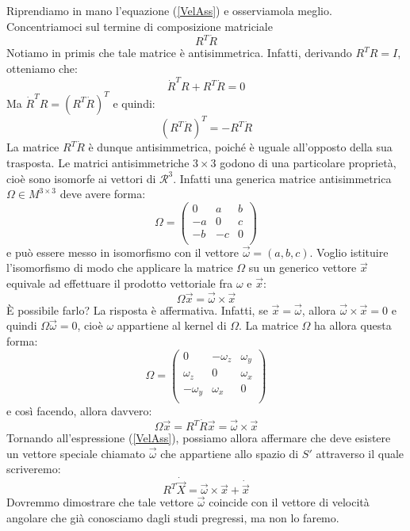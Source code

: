 \documentclass[a4paper,openany]{article}
\begin{document}
	Riprendiamo in mano l'equazione (\ref{VelAss}) e osserviamola meglio. Concentriamoci sul termine di composizione matriciale
	$$
	R^{T}\dot{R}
	$$
	Notiamo in primis che tale matrice è antisimmetrica. Infatti, derivando $R^{T}R = I$, otteniamo che:
	$$
	\dot{R}^{T}R + R^{T}\dot{R} = 0
	$$
	Ma $\dot{R}^{T}R = (R^{T}\dot{R})^{T}$ e quindi:
	$$
	(R^{T}\dot{R})^{T} = - R^{T}\dot{R} 
	$$
	La matrice $R^{T}\dot{R}$ è dunque antisimmetrica, poiché è uguale all'opposto della sua trasposta. Le matrici antisimmetriche $3\times3$ godono di una particolare proprietà, cioè sono isomorfe ai vettori di $\mathcal{R}^{3}$. Infatti una generica matrice antisimmetrica $\Omega \in M^{3\times3}$ deve avere forma:
	\begin{equation}
		\Omega = 
		\begin{pmatrix}
			0 & a & b \\
			-a & 0 & c \\
			-b & -c & 0 \\
		\end{pmatrix}
	\end{equation}
	e può essere messo in isomorfismo con il vettore $\vec{\omega} = (a,b,c)$. Voglio istituire l'isomorfismo di modo che applicare la matrice $\Omega$ su un generico vettore $\vec{x}$ equivale ad effettuare il prodotto vettoriale fra $\omega \mbox{ e } \vec{x}$:
	$$
	\Omega \vec{x} = \vec{\omega}\times\vec{x}
	$$
	È possibile farlo? La risposta è affermativa. Infatti, se $\vec{x} = \vec{\omega}$, allora $\vec{\omega}\times\vec{x} = 0$ e quindi $\Omega \vec{\omega} = 0$, cioè $\omega$ appartiene al kernel di $\Omega$. La matrice $\Omega$ ha allora questa forma:
	\begin{equation}
		\Omega = 
		\begin{pmatrix}
			0 & -\omega_z & \omega_y \\
			\omega_z & 0 & \omega_x \\
			-\omega_y & \omega_x & 0 \\
		\end{pmatrix}
	\end{equation}
	e così facendo, allora davvero:
	$$
	\Omega \vec{x} = R^{T}\dot{R}\vec{x} = \vec{\omega}\times\vec{x}
	$$
	Tornando all'espressione (\ref{VelAss}), possiamo allora affermare che deve esistere un vettore speciale chiamato $\vec{\omega}$ che appartiene allo spazio di $S'$ attraverso il quale scriveremo:
	\begin{equation}
		R^{T}\dot{\vec{X}} = \vec{\omega}\times\vec{x} + \dot{\vec{x}}
		\label{VelAss2}
	\end{equation}
	Dovremmo dimostrare che tale vettore $\vec{\omega}$ coincide con il vettore di velocità angolare che già conosciamo dagli studi pregressi, ma non lo faremo.
	
\end{document}
